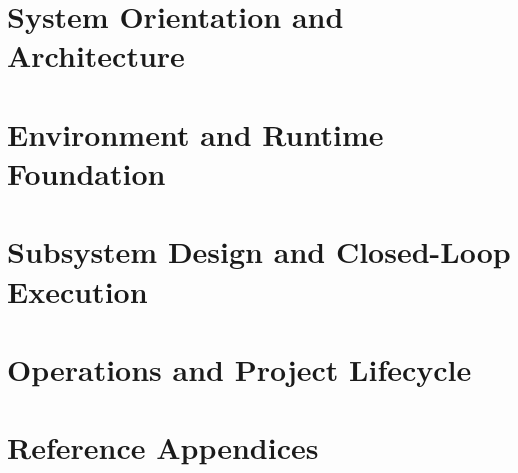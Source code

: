\documentclass[11pt,a4paper,oneside,openany]{book}
\begin{document}
\frontmatter


\tableofcontents
\clearpage
\listoftables

\mainmatter
\part{System Orientation and Architecture}




\part{Environment and Runtime Foundation}




\part{Subsystem Design and Closed-Loop Execution}




\part{Operations and Project Lifecycle}





\appendix
\part{Reference Appendices}




\end{document}

